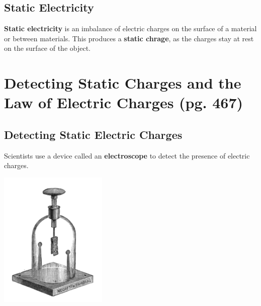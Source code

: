 \documentclass{article}
\begin{document}
    \subsection*{Static Electricity}
    \textbf{Static electricity} is an imbalance of electric charges on the surface of a material or between materials. This produces a \textbf{static chrage}, as the charges stay at rest on the surface of the object.\\


\newpage

\section{Detecting Static Charges and the Law of Electric Charges (pg. 467)}

    \subsection*{Detecting Static Electric Charges}

    Scientists use a device called an \textbf{electroscope} to detect the presence of electric charges.\\
    \begin{center}
    \includegraphics[scale = 0.5]{electroscope}
    \end{center}
\end{document}
